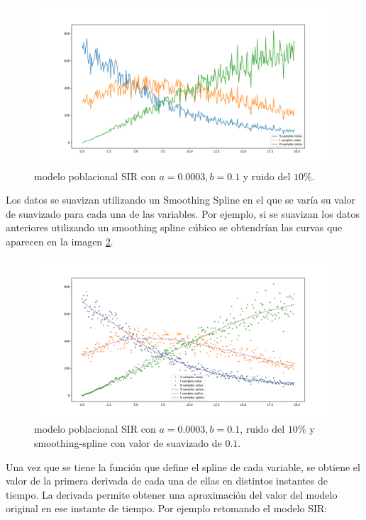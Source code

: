 \begin{figure}[h]
    \centering
    \includegraphics[width=\textwidth]{"figures/SIR_with_noise.pdf"}
    \caption{modelo poblacional SIR con $a = 0.0003, b = 0.1$ y ruido del $10\%$.}
    \label{fig:SIR_with_noise}
\end{figure}

Los datos se suavizan utilizando un Smoothing Spline en el que se varía su valor de suavizado para cada una de las variables. Por ejemplo, si se suavizan los datos anteriores utilizando un smoothing spline cúbico se obtendrían las curvas que aparecen en la imagen \ref{fig:SIR_noise_with_spline}.

\begin{figure}[h]
    \centering
    \includegraphics[width=\textwidth]{"figures/SIR_noise_with_spline.pdf"}
    \caption{modelo poblacional SIR con $a = 0.0003, b = 0.1$, ruido del $10\%$ y smoothing-spline con valor de suavizado de $0.1$.}
    \label{fig:SIR_noise_with_spline}
\end{figure}

Una vez que se tiene la función que define el spline de cada variable, se obtiene el valor de la primera derivada de cada una de ellas en distintos instantes de tiempo. La derivada permite obtener una aproximación del valor del modelo original en ese instante de tiempo. Por ejemplo retomando el modelo SIR:

